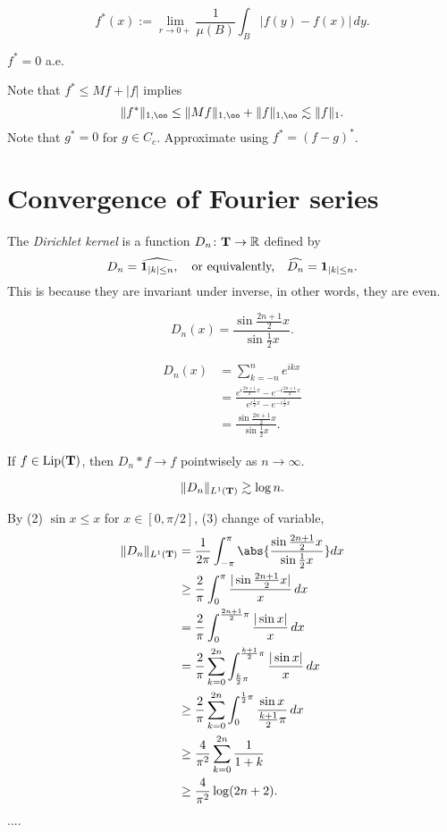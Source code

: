 \documentclass{../crs}
\begin{document}
\begin{defn}
\[f^*(x):=\lim_{r\to0+}\frac1{\mu(B)}\int_B|f(y)-f(x)|\,dy.\]
\end{defn}
\begin{thm}
$f^*=0$ a.e.
\end{thm}
\begin{pf}
Note that $f^*\le Mf+|f|$ implies
\[\|f^*\|_{1,\oo}\le\|Mf\|_{1,\oo}+\|f\|_{1,\oo}\lesssim\|f\|_1.\]
Note that $g^*=0$ for $g\in C_c$.
Approximate using $f^*=(f-g)^*$.
\end{pf}








\section{Convergence of Fourier series}
\begin{defn}
The \emph{Dirichlet kernel} is a function $D_n\colon \mathbf{T}\to\mathbb{R}$ defined by
\[D_n=\widehat{\mathbf{1}_{|k|\le n}},\quad\text{or equivalently,}\quad\widehat{D_n}=\mathbf{1}_{|k|\le n}.\]
This is because they are invariant under inverse, in other words, they are even.
\end{defn}

\begin{thm}
\[D_n(x)=\frac{\sin\frac{2n+1}2x}{\sin\frac12x}.\]
\end{thm}
\begin{pf}
\begin{align*}
D_n(x)&=\sum_{k=-n}^ne^{ikx}\\
&=\frac{e^{i\frac{2n+1}2x}-e^{-i\frac{2n+1}2x}}{e^{i\frac12x}-e^{-i\frac12x}}\\
&=\frac{\sin\frac{2n+1}2x}{\sin\frac12x}.
\end{align*}

\end{pf}

\begin{thm}
If $f\in\operatorname{Lip}(\mathbf{T})$, then $D_n*f\to f$ pointwisely as $n\to\infty$.
\end{thm}

\begin{thm}
\[\|D_n\|_{L^1(\mathbf{T})}\gtrsim\log n.\]
\end{thm}
\begin{pf}
By (2) $\sin x\le x$ for $x\in[0,\pi/2]$, (3) change of variable,
\begin{align*}
\|D_n\|_{L^1(\bT)}
&=\frac1{2\pi}\int_{-\pi}^\pi\abs{\frac{\sin\frac{2n+1}2x}{\sin\frac12x}}dx\\
&\ge\frac2\pi\int_0^\pi\frac{|\sin\frac{2n+1}2x|}x\,dx\\
&=\frac2\pi\int_0^{\frac{2n+1}2\pi}\frac{|\sin x|}x\,dx\\
&=\frac2\pi\sum_{k=0}^{2n}\int_{\frac k2\pi}^{\frac{k+1}2\pi}\frac{|\sin x|}x\,dx\\
&\ge\frac2\pi\sum_{k=0}^{2n}\int_0^{\frac12\pi}\frac{\sin x}{\frac{k+1}2\pi}\,dx\\
&\ge\frac4{\pi^2}\sum_{k=0}^{2n}\frac1{1+k}\\
&\ge\frac4{\pi^2}\log(2n+2).
\end{align*}....
\end{pf}
\end{document}

